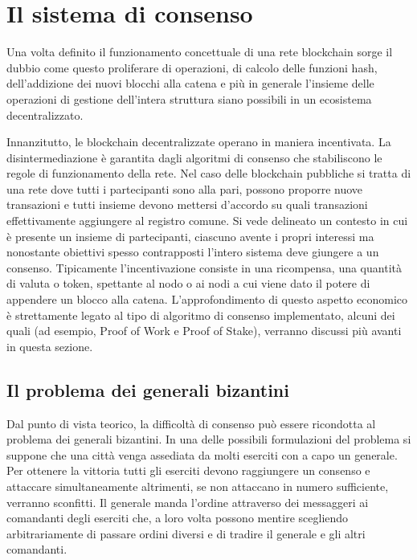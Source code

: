 \section{Il sistema di consenso} %

Una volta definito il funzionamento concettuale di una rete blockchain sorge il dubbio come questo proliferare di operazioni, di calcolo delle funzioni hash, dell'addizione dei nuovi blocchi alla catena e più in generale l'insieme delle operazioni di gestione dell'intera struttura siano possibili in un ecosistema decentralizzato. 

Innanzitutto, le blockchain decentralizzate operano in maniera incentivata. La disintermediazione è garantita dagli algoritmi di consenso che stabiliscono le regole di funzionamento della rete. Nel caso delle blockchain pubbliche si tratta di una rete dove tutti i partecipanti sono alla pari, possono proporre nuove transazioni e tutti insieme devono mettersi d'accordo su quali transazioni effettivamente aggiungere al registro comune. Si vede delineato un contesto in cui è presente un insieme di partecipanti, ciascuno avente i propri interessi ma nonostante obiettivi spesso contrapposti l'intero sistema deve giungere a un consenso. Tipicamente l'incentivazione consiste in una ricompensa, una quantità di valuta o token, spettante al nodo o ai nodi a cui viene dato il potere di appendere un blocco alla catena. L’approfondimento di questo aspetto economico è strettamente legato al tipo di algoritmo di consenso implementato, alcuni dei quali (ad esempio, Proof of Work e Proof of Stake), verranno discussi più avanti in questa sezione.

\subsection{Il problema dei generali bizantini}

Dal punto di vista teorico, la difficoltà di consenso può essere ricondotta al problema dei generali bizantini. In una delle possibili formulazioni del problema si suppone che una città venga assediata da molti eserciti con a capo un generale. Per ottenere la vittoria tutti gli eserciti devono raggiungere un consenso e attaccare simultaneamente altrimenti, se non attaccano in numero sufficiente, verranno sconfitti. Il generale manda l’ordine attraverso dei messaggeri ai comandanti degli eserciti che, a loro volta possono mentire scegliendo arbitrariamente di passare ordini diversi e di tradire il generale e gli altri comandanti.

